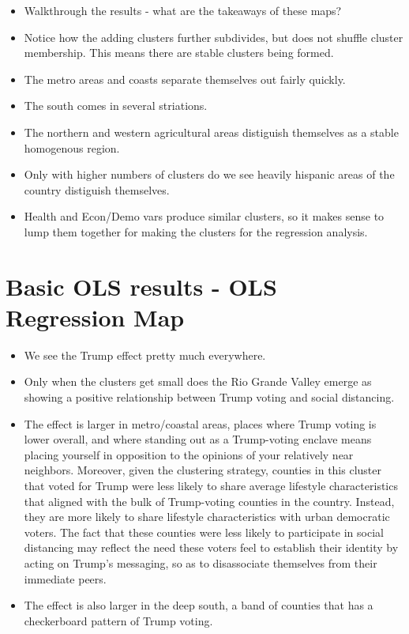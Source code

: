 \documentclass{article}
\begin{document}
\begin{itemize}
	\item Walkthrough the results - what are the takeaways of these maps?
	\item Notice how the adding clusters further subdivides, but does not shuffle cluster membership. This means there are stable clusters being formed. 
	\item The metro areas and coasts separate themselves out fairly quickly. 
	\item The south comes in several striations.
	\item The northern and western agricultural areas distiguish themselves as a stable homogenous region.
	\item Only with higher numbers of clusters do we see heavily hispanic areas of the country distiguish themselves. 
	\item Health and Econ/Demo vars produce similar clusters, so it makes sense to lump them together for making the clusters for the regression analysis. 
\end{itemize}

\section{Basic OLS results - OLS Regression Map}

\begin{itemize}
	\item We see the Trump effect pretty much everywhere. 
	\item Only when the clusters get small does the Rio Grande Valley emerge as showing a positive relationship between Trump voting and social distancing. 
	\item The effect is larger in metro/coastal areas, places where Trump voting is lower overall, and where standing out as a Trump-voting enclave means placing yourself in opposition to the opinions of your relatively near neighbors. Moreover, given the clustering strategy, counties in this cluster that voted for Trump were less likely to share average lifestyle characteristics that aligned with the bulk of Trump-voting counties in the country. Instead, they are more likely to share lifestyle characteristics with urban democratic voters. The fact that these counties were less likely to participate in social distancing may reflect the need these voters feel to establish their identity by acting on Trump's messaging, so as to disassociate themselves from their immediate peers. 
	\item The effect is also larger in the deep south, a band of counties that has a checkerboard pattern of Trump voting. 
\end{itemize}
\end{document}
